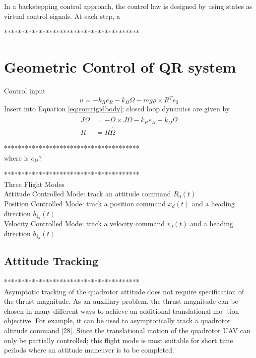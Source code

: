 In a backstepping control approach, the control law is designed by using states as virtual control signals. At each step, a 

***************************************\\

\section{Geometric Control of QR system}

Control input \cite{Lee2011}
\begin{equation}\label{eq:inputattitude}
u=-k_Re_R-k_\Omega\Omega-mg\rho\times R^Te_3
\end{equation}
Insert into Equation \ref{eq:eomrigidbody}; closed loop dynamics are given by
\begin{align}\label{eq:CLdynamics}
J\dot{\Omega} &= -\Omega\times J\Omega-k_Re_R-k_\Omega\Omega \\
\dot{R} &= R\hat{\Omega}
\end{align}

***************************************\\
where is $ e_\Omega $?

***************************************\\

Three Flight Modes \cite{Lee,Lee2010c}\\
Attitude Controlled Mode: track an attitude command $ R_d(t) $ \\
Position Controlled Mode: track a position command $ x_d(t) $ and a heading direction $ b_{1_d}(t) $\\
Velocity Controlled Mode: track a velocity command $ v_d(t) $ and a heading direction $ b_{1_d}(t) $\\

		\subsection{Attitude Tracking}
		***************************************\\
		Asymptotic tracking of the quadrotor attitude does not require specification of the thrust magnitude. As an auxiliary problem, the thrust magnitude can be chosen in many different ways to achieve an additional translational mo- tion objective. For example, it can be used to asymptotically track a quadrotor altitude command [28]. Since the translational motion of the quadrotor UAV can only be partially controlled; this flight mode is most suitable for short time periods where an attitude maneuver is to be completed. \cite{Goodarzi2015b}
		
